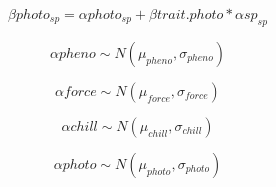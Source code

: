 \documentclass{article}\usepackage[]{graphicx}\usepackage[]{color}
\begin{document}
\begin{equation}
\label{betaPhotoEq}
\beta photo_{sp} = \alpha photo_{sp} + \beta trait.photo * \alpha sp_{sp}
\end{equation}

\begin{equation}
\label{alphaPheneq}
\alpha pheno  \sim N(\mu_{pheno}, \sigma_{pheno}) 
\end{equation}

\begin{equation}
\label{alphaForceq}
\alpha force \sim N(\mu_{force}, \sigma_{force}) 
\end{equation}

\begin{equation}
\label{alphachilleq}
\alpha chill  \sim N(\mu_{chill}, \sigma_{chill})
\end{equation}

\begin{equation}
\label{alphaptotec}
\alpha photo  \sim N(\mu_{photo}, \sigma_{photo}) 
\end{equation}


\end{document}
